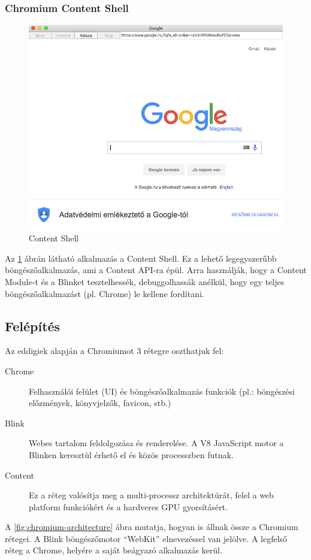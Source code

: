 \documentclass[12pt]{report}
\begin{document}
\subsubsection{Chromium Content Shell}
\begin{figure}[h]
    \centering
    \includegraphics[scale=0.3]{content-shell}
    \caption{
        \label{fig:content-shell}
        Content Shell
    }
\end{figure}

\noindent
Az \ref{fig:content-shell} ábrán látható alkalmazás a Content Shell. Ez a lehető
legegyszerűbb böngészőalkalmazás, ami a Content API-ra épül. Arra használják, hogy a
Content Module-t és a Blinket tesztelhessék, debuggolhassák anélkül, hogy egy teljes
böngészőalkalmazást (pl. Chrome) le kellene fordítani.

\subsection{Felépítés}
Az eddigiek alapján a Chromiumot 3 rétegre oszthatjuk fel:
\begin{description}
    \item[Chrome]
        Felhasználói felület (UI) és böngészőalkalmazás funkciók
        (pl.: böngészési előzmények, könyvjelzők, favicon, stb.)
    \item[Blink]
        Webes tartalom feldolgozása és renderelése. A V8 JavaScript motor a
        Blinken keresztül érhető el és közös processzben futnak.
    \item[Content]
        Ez a réteg valósítja meg a multi-processz architektúrát,
        felel a web platform funkciókért és a hardveres GPU gyorsításért.
\end{description}
A \ref{fig:chromium-architecture} ábra mutatja, hogyan is állnak össze a Chromium rétegei.
A Blink böngészőmotor ``WebKit'' elnevezéssel van jelölve.
A legfelső réteg a Chrome, helyére a saját beágyazó alkalmazás kerül.
\end{document}

